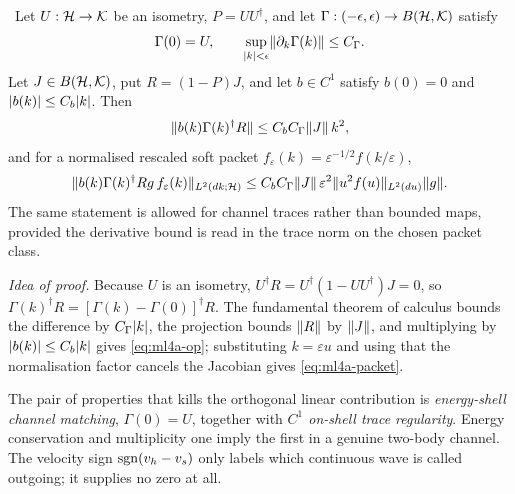 \begin{lemma}
\label{thm:ml4-a}
\statusProved\ Let $U:\mathcal{H}\to\mathcal{K}$ be an isometry, $P=UU^{\dagger}$, and let
$\Gamma:(-\epsilon,\epsilon)\to B(\mathcal{H},\mathcal{K})$ satisfy
\begin{equation}
  \Gamma(0)=U,\qquad
  \sup_{\lvert k\rvert<\epsilon}\lVert \partial_k\Gamma(k)\rVert\le C_\Gamma .
\end{equation}
Let $J\in B(\mathcal{H},\mathcal{K})$, put $R=(1-P)J$, and let $b\in C^1$ satisfy $b(0)=0$
and $\lvert b(k)\rvert\le C_b\lvert k\rvert$. Then
\begin{equation}
  \lVert b(k)\Gamma(k)^{\dagger}R\rVert\le C_bC_\Gamma\lVert J\rVert\,k^2 ,
  \label{eq:ml4a-op}
\end{equation}
and for a normalised rescaled soft packet
$f_\varepsilon(k)=\varepsilon^{-1/2}f(k/\varepsilon)$,
\begin{equation}
  \lVert b(k)\Gamma(k)^{\dagger}Rg\,f_\varepsilon(k)\rVert_{L^2(dk;\mathcal{H})}
  \le C_bC_\Gamma\lVert J\rVert\,\varepsilon^2
    \lVert u^2f(u)\rVert_{L^2(du)}\lVert g\rVert .
  \label{eq:ml4a-packet}
\end{equation}
The same statement is allowed for channel traces rather than bounded maps,
provided the derivative bound is read in the trace norm on the chosen packet
class.
\end{lemma}

\emph{Idea of proof.} Because $U$ is an isometry, $U^{\dagger}R=U^{\dagger}(1-UU^{\dagger})J=0$,
so $\Gamma(k)^{\dagger}R=[\Gamma(k)-\Gamma(0)]^{\dagger}R$. The fundamental
theorem of calculus bounds the difference by $C_\Gamma\lvert k\rvert$, the projection
bounds $\lVert R\rVert$ by $\lVert J\rVert$, and multiplying by $\lvert b(k)\rvert\le C_b\lvert k\rvert$
gives \cref{eq:ml4a-op}; substituting $k=\varepsilon u$ and using that the
normalisation factor cancels the Jacobian gives \cref{eq:ml4a-packet}.

\begin{remark}
\label{rem:ml4a-moral}
The pair of properties that kills the orthogonal linear contribution is
\emph{energy-shell channel matching}, $\Gamma(0)=U$, together with \emph{$C^1$
on-shell trace regularity}. Energy conservation and multiplicity one imply the
first in a genuine two-body channel. The velocity sign $\operatorname{sgn}(v_h-v_s)$ only
labels which continuous wave is called outgoing; it supplies no zero at all.
\end{remark}

